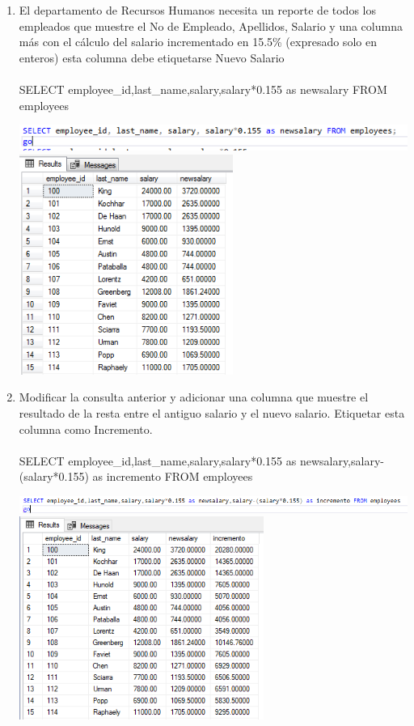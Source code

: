 \begin{enumerate}[1.]
	\item El departamento de Recursos Humanos necesita un reporte de todos los empleados que muestre el No de Empleado, Apellidos, Salario y una columna más con el cálculo del salario incrementado en 15.5\% (expresado solo en enteros) esta columna debe etiquetarse Nuevo Salario
	\\
	\\SELECT employee\_id,last\_name,salary,salary*0.155 as newsalary FROM employees
	\begin{center}
	\includegraphics[width=15cm]{./Imagenes/actividad_05_02a}
	\includegraphics[width=7cm]{./Imagenes/actividad_05_02}
	\end{center}

	\item Modificar la consulta anterior y adicionar una columna que muestre el resultado de la resta entre el antiguo salario y el nuevo salario. Etiquetar esta columna como Incremento.
	\\
	\\SELECT employee\_id,last\_name,salary,salary*0.155 as newsalary,salary-(salary*0.155) as incremento FROM employees
	\begin{center}
	\includegraphics[width=16cm]{./Imagenes/actividad_05_03a}
	\includegraphics[width=8cm]{./Imagenes/actividad_05_03}
	\end{center}


\end{enumerate}
